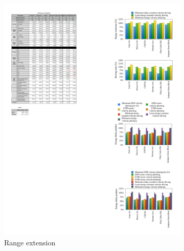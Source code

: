 \documentclass{IEEEtran}
\begin{document}
\begin{figure}   %
\centering
	\begin{subfigure}{0.45\textwidth}
	\includegraphics[width=\hsize]{Figures/range_comp_bar.pdf}
	\caption{Range extension}
	\label{fig:range_comp}
	\end{subfigure}
~
	\begin{subfigure}{0.45\textwidth}

\end{subfigure}
\end{figure}
\end{document}
